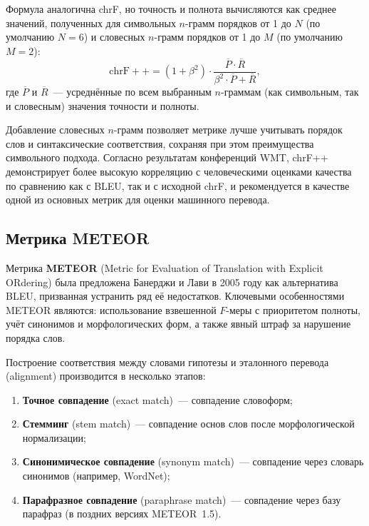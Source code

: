 \documentclass[14pt,a4paper]{extreport}
\begin{document}
Формула аналогична chrF, но точность и полнота вычисляются как среднее значений, полученных для символьных $n$-грамм порядков от 1 до $N$ (по умолчанию $N = 6$) и словесных $n$-грамм порядков от 1 до $M$ (по умолчанию $M = 2$):
\begin{equation}
\mathrm{chrF{+}{+}} = (1 + \beta^2) \cdot \frac{\overline{P} \cdot \overline{R}}{\beta^2 \cdot \overline{P} + \overline{R}},
\end{equation}
где $\overline{P}$ и $\overline{R}$~--- усреднённые по всем выбранным $n$-граммам (как символьным, так и словесным) значения точности и полноты.


Добавление словесных $n$-грамм позволяет метрике лучше учитывать порядок слов и синтаксические соответствия, сохраняя при этом преимущества символьного подхода. Согласно результатам конференций WMT, chrF++ демонстрирует более высокую корреляцию с человеческими оценками качества по сравнению как с BLEU, так и с исходной chrF, и рекомендуется в качестве одной из основных метрик для оценки машинного перевода.

\subsection{Метрика METEOR}

Метрика \textbf{METEOR} (Metric for Evaluation of Translation with Explicit ORdering) была предложена Банерджи и Лави в 2005 году \cite{banerjee2005meteor} как альтернатива BLEU, призванная устранить ряд её недостатков. Ключевыми особенностями METEOR являются: использование взвешенной $F$-меры с приоритетом полноты, учёт синонимов и морфологических форм, а также явный штраф за нарушение порядка слов.


Построение соответствия между словами гипотезы и эталонного перевода (alignment) производится в несколько этапов:
\begin{enumerate}
    \item \textbf{Точное совпадение} (exact match)~--- совпадение словоформ;
    \item \textbf{Стемминг} (stem match)~--- совпадение основ слов после морфологической нормализации;
    \item \textbf{Синонимическое совпадение} (synonym match)~--- совпадение через словарь синонимов (например, WordNet);
    \item \textbf{Парафразное совпадение} (paraphrase match)~--- совпадение через базу парафраз (в поздних версиях METEOR~1.5).
\end{enumerate}
\end{document}
